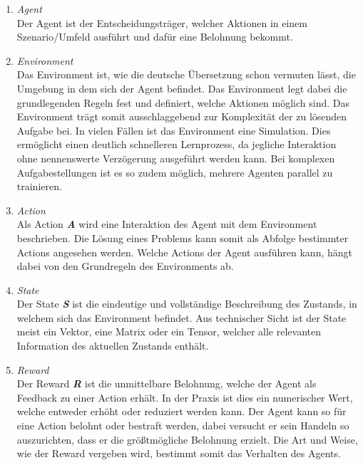 \begin{enumerate}
    \begin{enumerate}
        \item \textit{Agent}\\
        Der Agent \cite{mediumBeginnersGuide} ist der Entscheidungsträger, welcher Aktionen in einem Szenario/Umfeld ausführt und dafür eine Belohnung bekommt.
        \item \textit{Environment}\\
        Das Environment \cite{datasolutReinforcementLearning} ist, wie die deutsche Übersetzung schon vermuten lässt, die Umgebung in dem sich der Agent befindet. Das Environment legt dabei die grundlegenden Regeln fest und definiert, welche Aktionen möglich sind. Das Environment trägt somit ausschlaggebend zur Komplexität der zu lösenden Aufgabe bei. In vielen Fällen ist das Environment eine Simulation. Dies ermöglicht einen deutlich schnelleren Lernprozess, da jegliche Interaktion ohne nennenswerte Verzögerung ausgeführt werden kann. Bei komplexen Aufgabestellungen ist es so zudem möglich, mehrere Agenten parallel zu trainieren.
        \item \textit{Action}\\
        Als Action \textbf{\textit{A}} wird eine Interaktion des Agent mit dem Environment beschrieben. Die Lösung eines Problems kann somit als Abfolge bestimmter Actions angesehen werden. Welche Actions der Agent ausführen kann, hängt dabei von den Grundregeln des Environments ab.
        \item \textit{State}\\
        Der State \textbf{\textit{S}} ist die eindeutige und vollständige Beschreibung des Zustands, in welchem sich das Environment befindet. Aus technischer Sicht ist der State meist ein Vektor, eine Matrix oder ein Tensor, welcher alle relevanten Information des aktuellen Zustands enthält.
        \item \textit{Reward}\\
        Der Reward \textbf{\textit{R}} \cite{datasolutReinforcementLearning} ist die unmittelbare Belohnung, welche der Agent als Feedback zu einer Action erhält. In der Praxis ist dies ein numerischer Wert, welche entweder erhöht oder reduziert werden kann. Der Agent kann so für eine Action belohnt oder bestraft werden, dabei versucht er sein Handeln so auszurichten, dass er die größtmögliche Belohnung erzielt. Die Art und Weise, wie der Reward vergeben wird, bestimmt somit das Verhalten des Agents.
    \end{enumerate}


\end{enumerate}
